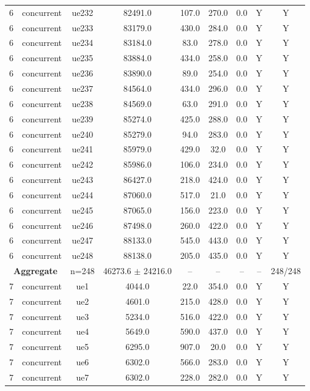 \begin{table}[ht]
\begin{tabular}{|c|c|c|c|c|c|c|c|c|}
6 & concurrent & ue232 & 82491.0 & 107.0 & 270.0 & 0.0 & Y & Y \\
6 & concurrent & ue233 & 83179.0 & 430.0 & 284.0 & 0.0 & Y & Y \\
6 & concurrent & ue234 & 83184.0 & 83.0 & 278.0 & 0.0 & Y & Y \\
6 & concurrent & ue235 & 83884.0 & 434.0 & 258.0 & 0.0 & Y & Y \\
6 & concurrent & ue236 & 83890.0 & 89.0 & 254.0 & 0.0 & Y & Y \\
6 & concurrent & ue237 & 84564.0 & 434.0 & 296.0 & 0.0 & Y & Y \\
6 & concurrent & ue238 & 84569.0 & 63.0 & 291.0 & 0.0 & Y & Y \\
6 & concurrent & ue239 & 85274.0 & 425.0 & 288.0 & 0.0 & Y & Y \\
6 & concurrent & ue240 & 85279.0 & 94.0 & 283.0 & 0.0 & Y & Y \\
6 & concurrent & ue241 & 85979.0 & 429.0 & 32.0 & 0.0 & Y & Y \\
6 & concurrent & ue242 & 85986.0 & 106.0 & 234.0 & 0.0 & Y & Y \\
6 & concurrent & ue243 & 86427.0 & 218.0 & 424.0 & 0.0 & Y & Y \\
6 & concurrent & ue244 & 87060.0 & 517.0 & 21.0 & 0.0 & Y & Y \\
6 & concurrent & ue245 & 87065.0 & 156.0 & 223.0 & 0.0 & Y & Y \\
6 & concurrent & ue246 & 87498.0 & 260.0 & 422.0 & 0.0 & Y & Y \\
6 & concurrent & ue247 & 88133.0 & 545.0 & 443.0 & 0.0 & Y & Y \\
6 & concurrent & ue248 & 88138.0 & 205.0 & 435.0 & 0.0 & Y & Y \\
\multicolumn{2}{|c|}{\textbf{Aggregate}} & n=248 & 46273.6 $\pm$ 24216.0 & -- & -- & -- & -- & 248/248 \\
\hline
7 & concurrent & ue1 & 4044.0 & 22.0 & 354.0 & 0.0 & Y & Y \\
7 & concurrent & ue2 & 4601.0 & 215.0 & 428.0 & 0.0 & Y & Y \\
7 & concurrent & ue3 & 5234.0 & 516.0 & 422.0 & 0.0 & Y & Y \\
7 & concurrent & ue4 & 5649.0 & 590.0 & 437.0 & 0.0 & Y & Y \\
7 & concurrent & ue5 & 6295.0 & 907.0 & 20.0 & 0.0 & Y & Y \\
7 & concurrent & ue6 & 6302.0 & 566.0 & 283.0 & 0.0 & Y & Y \\
7 & concurrent & ue7 & 6302.0 & 228.0 & 282.0 & 0.0 & Y & Y \\

\end{tabular}
\end{table}
